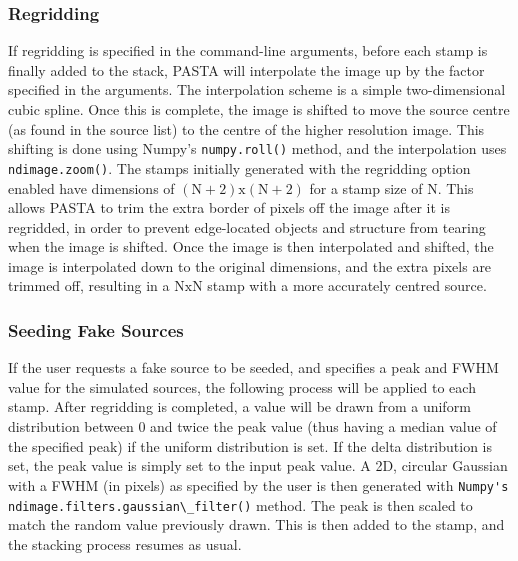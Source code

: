 \documentclass{article}
\begin{document}
\subsubsection{Regridding}
If regridding is specified in the command-line arguments, before each stamp
is finally added to the stack, PASTA will interpolate the image up by the factor
specified in the arguments. The interpolation scheme is a simple two-dimensional
cubic spline.  Once this is complete, the image is shifted to move the source 
centre (as found in the source list) to the centre of the higher resolution 
image.  This shifting is done using Numpy's \verb!numpy.roll()! method, and the
interpolation uses \verb!ndimage.zoom()!. The stamps initially generated with 
the regridding option enabled have dimensions of $\mathrm{(N+2)x(N+2)}$ for a 
stamp size of N. This allows PASTA to trim the extra border of pixels off the 
image after it is regridded, in order to prevent edge-located objects and 
structure from tearing when the image is shifted.   Once the image is then 
interpolated and shifted, the image is interpolated down to the original 
dimensions, and the extra pixels are trimmed off, resulting in a $\mathrm{NxN}$
stamp with a more accurately centred source.

\subsubsection{Seeding Fake Sources}
If the user requests a fake source to be seeded, and specifies a peak and FWHM 
value for the simulated sources, the following process will be applied to each 
stamp.  After regridding is completed, a value will be drawn from a uniform 
distribution between 0 and twice the peak value (thus having a median value of
the specified peak) if the uniform distribution is set. If the delta 
distribution is set, the peak value is simply set to the input peak value.
A 2D, circular Gaussian with a FWHM (in pixels) as 
specified by the user is then generated with 
\verb!Numpy's ndimage.filters.gaussian\_filter()! method.  The peak is then 
scaled to match the random value previously drawn.  This is then added to the 
stamp, and the stacking process resumes as usual.
\end{document}
